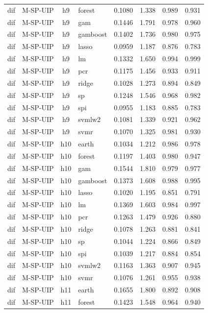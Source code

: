 \begin{ThreePartTable}
\begin{longtable}[t]{llclcccc}
dif & M-SP-UIP & h9 & forest & 0.1080 & 1.338 & 0.989 & 0.931\\
dif & M-SP-UIP & h9 & gam & 0.1446 & 1.791 & 0.978 & 0.960\\
dif & M-SP-UIP & h9 & gamboost & 0.1402 & 1.736 & 0.980 & 0.975\\
dif & M-SP-UIP & h9 & lasso & 0.0959 & 1.187 & 0.876 & 0.783\\
dif & M-SP-UIP & h9 & lm & 0.1332 & 1.650 & 0.994 & 0.999\\
dif & M-SP-UIP & h9 & pcr & 0.1175 & 1.456 & 0.933 & 0.911\\
dif & M-SP-UIP & h9 & ridge & 0.1028 & 1.273 & 0.894 & 0.849\\
dif & M-SP-UIP & h9 & sp & 0.1248 & 1.546 & 0.968 & 0.982\\
dif & M-SP-UIP & h9 & spi & 0.0955 & 1.183 & 0.885 & 0.783\\
dif & M-SP-UIP & h9 & svmlw2 & 0.1081 & 1.339 & 0.921 & 0.962\\
dif & M-SP-UIP & h9 & svmr & 0.1070 & 1.325 & 0.981 & 0.930\\
\addlinespace
dif & M-SP-UIP & h10 & earth & 0.1034 & 1.212 & 0.986 & 0.978\\
dif & M-SP-UIP & h10 & forest & 0.1197 & 1.403 & 0.980 & 0.947\\
dif & M-SP-UIP & h10 & gam & 0.1544 & 1.810 & 0.979 & 0.977\\
dif & M-SP-UIP & h10 & gamboost & 0.1373 & 1.608 & 0.988 & 0.995\\
dif & M-SP-UIP & h10 & lasso & 0.1020 & 1.195 & 0.851 & 0.791\\
dif & M-SP-UIP & h10 & lm & 0.1369 & 1.603 & 0.984 & 0.997\\
dif & M-SP-UIP & h10 & pcr & 0.1263 & 1.479 & 0.926 & 0.880\\
dif & M-SP-UIP & h10 & ridge & 0.1078 & 1.263 & 0.881 & 0.841\\
dif & M-SP-UIP & h10 & sp & 0.1044 & 1.224 & 0.866 & 0.849\\
dif & M-SP-UIP & h10 & spi & 0.1039 & 1.217 & 0.884 & 0.854\\
dif & M-SP-UIP & h10 & svmlw2 & 0.1163 & 1.363 & 0.907 & 0.945\\
dif & M-SP-UIP & h10 & svmr & 0.1076 & 1.261 & 0.955 & 0.938\\
\addlinespace
dif & M-SP-UIP & h11 & earth & 0.1655 & 1.800 & 0.892 & 0.908\\
dif & M-SP-UIP & h11 & forest & 0.1423 & 1.548 & 0.964 & 0.940\\

\end{longtable}
\end{ThreePartTable}
